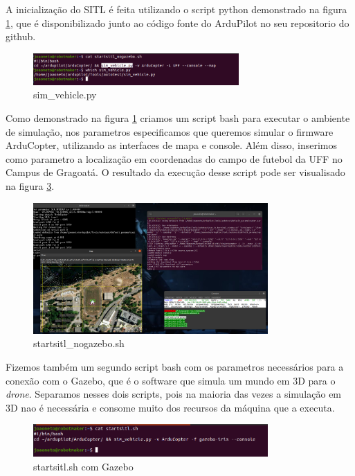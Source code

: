 \documentclass[12pt,a4paper,oneside]{book}
\begin{document}
A inicialização do SITL é feita utilizando o script python demonstrado na figura \ref{fig:sim_vehicle.png.0}, que é disponibilizado junto ao código fonte do ArduPilot no seu repositorio do github.

%
\begin{figure}[H]
  \centering
  \includegraphics[width=0.7\textwidth]{Images/Desenvolvimento/sim_vehicle.png}
  \caption{sim\_vehicle.py}
  \label{fig:sim_vehicle.png.0}
\end{figure}
%

Como demonstrado na figura \ref{fig:sim_vehicle.png.0} criamos um script bash para executar o ambiente de simulação, nos parametros especificamos que queremos simular o firmware ArduCopter, utilizando as interfaces de mapa e console. Além disso, inserimos como parametro a localização em coordenadas do campo de futebol da UFF no Campus de Gragoatá. O resultado da execução desse script pode ser visualisado na figura \ref{fig:startsitl_nogazebo.png.0}.

%
\begin{figure}[H]
  \centering
  \includegraphics[width=0.8\textwidth]{Images/Desenvolvimento/startsitl_nogazebo.png}
  \caption{startsitl\_nogazebo.sh}
  \label{fig:startsitl_nogazebo.png.0}
\end{figure}
%

Fizemos também um segundo script bash com os parametros necessários para a conexão com o Gazebo, que é o software que simula um mundo em 3D para o \textit{drone}. Separamos nesses dois scripts, pois na maioria das vezes a simulação em 3D nao é necessária e consome muito dos recursos da máquina que a executa.

%
\begin{figure}[H]
  \centering
  \includegraphics[width=0.8\textwidth]{Images/Desenvolvimento/startsitl.sh.png}
  \caption{startsitl.sh com Gazebo}
  \label{fig:startsitl_nogazebo.png.0}
\end{figure}
%
\end{document}
